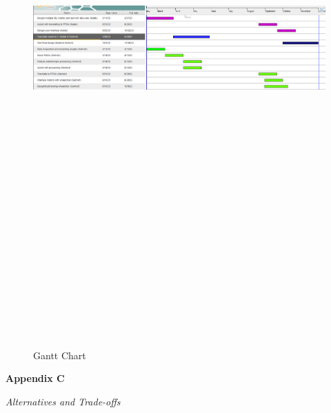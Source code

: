 \documentclass[conference]{IEEEtran}
\begin{document}
    \begin{figure}
        \centering
        \centerline{\includegraphics[angle=90, height=9in, keepaspectratio]{figs/gnatt.png}}
            \caption{Gantt Chart}
            \label{fig:gantt}
    \end{figure}
    \twocolumn
    
        
        
\clearpage
\onecolumn
\begin{center}
    \vspace*{5cm}
     {\Huge\bfseries Appendix C \par}
     \vspace{1cm}
    \textit{Alternatives and Trade-offs} \\
\end{center}
\clearpage
\twocolumn
\end{document}
